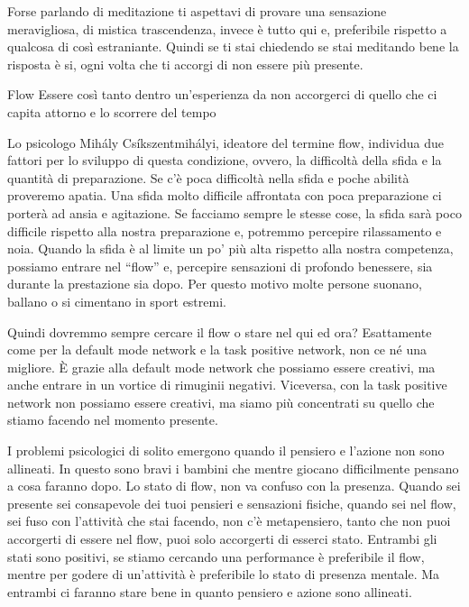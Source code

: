 \documentclass[12pt]{book} %
\begin{document}
Forse parlando di meditazione ti aspettavi di provare una sensazione meravigliosa, di mistica trascendenza, invece è
tutto qui e, preferibile rispetto a qualcosa di così estraniante. Quindi se ti stai chiedendo se stai meditando bene la
risposta è si, ogni volta che ti accorgi di non essere più presente.

\begin{mdframed}[linewidth=1pt]
Flow
Essere così tanto dentro un'esperienza da non accorgerci di quello che ci capita attorno e lo scorrere del tempo

Lo psicologo Mihály Csíkszentmihályi, ideatore del termine flow, individua due fattori per lo sviluppo di questa
condizione, ovvero, la difficoltà della sfida e la quantità di preparazione. Se c'è poca difficoltà nella sfida e poche abilità proveremo apatia. Una sfida molto difficile affrontata con poca preparazione ci
porterà ad ansia e agitazione. Se facciamo sempre le stesse cose, la sfida sarà poco difficile rispetto alla nostra
preparazione e, potremmo percepire rilassamento e noia. Quando la sfida è al limite un po'
più alta rispetto alla nostra competenza, possiamo entrare nel “flow” e, percepire sensazioni di profondo benessere,
sia durante la prestazione sia dopo. Per questo motivo molte persone suonano, ballano o si cimentano in sport estremi.

Quindi dovremmo sempre cercare il flow o stare nel qui ed ora? 
Esattamente come per la default mode network e la task positive network, non ce né una migliore. È grazie alla default mode network che possiamo essere creativi, ma anche entrare in un vortice di rimuginii negativi. Viceversa, con la task positive network non possiamo essere creativi, ma siamo più concentrati su
quello che stiamo facendo nel momento presente.

I problemi psicologici di solito emergono quando il pensiero e l'azione non sono allineati. In questo sono bravi i bambini che mentre giocano difficilmente pensano a cosa faranno dopo. Lo stato di flow, non va confuso con la presenza. Quando sei presente sei consapevole dei tuoi pensieri e sensazioni fisiche, quando sei nel flow, sei fuso con l'attività che stai facendo, non c'è metapensiero, tanto che non puoi accorgerti di essere nel flow, puoi solo accorgerti di esserci stato. Entrambi gli stati sono positivi, se stiamo cercando una performance è preferibile il flow, mentre per godere di un'attività è preferibile lo stato di presenza mentale. Ma entrambi ci faranno stare bene in quanto pensiero e azione sono allineati.
\end{mdframed}
\end{document}
